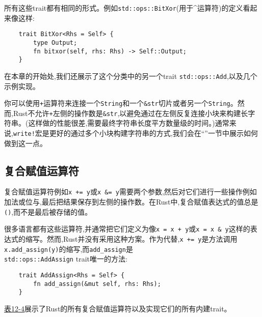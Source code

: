 所有这些trait都有相同的形式。例如\texttt{std::ops::BitXor}(用于\^{}运算符)的定义看起来像这样:
\begin{verbatim}
    trait BitXor<Rhs = Self> {
        type Output;
        fn bitxor(self, rhs: Rhs) -> Self::Output;
    }
\end{verbatim}

在本章的开始处,我们还展示了这个分类中的另一个trait \texttt{std::ops::Add},以及几个示例实现。

你可以使用\texttt{+}运算符来连接一个\texttt{String}和一个\texttt{\&str}切片或者另一个\texttt{String}。然而,Rust不允许\texttt{+}左侧的操作数是\texttt{\&str},以避免通过在左侧反复连接小块来构建长字符串。(这样做的性能很差,需要最终字符串长度平方数量级的时间。)通常来说,\texttt{write!}宏是更好的通过多个小块构建字符串的方式,我们会在“”一节中展示如何做到这一点。

\subsection{复合赋值运算符}\label{assign}
复合赋值运算符例如\texttt{x += y}或\texttt{x \&= y}需要两个参数,然后对它们进行一些操作例如加法或位与,最后把结果保存到左侧的操作数。在Rust中,复合赋值表达式的值总是\texttt{()},而不是最后被存储的值。

很多语言都有这些运算符,并通常把它们定义为像\texttt{x = x + y}或\texttt{x = x \& y}这样的表达式的缩写。然而,Rust并没有采用这种方案。作为代替,\texttt{x += y}是方法调用\texttt{x.add\_assign(y)}的缩写,而\texttt{add\_assign}是\\
\texttt{std::ops::AddAssign} trait唯一的方法:
\begin{verbatim}
    trait AddAssign<Rhs = Self> {
        fn add_assign(&mut self, rhs: Rhs);
    }
\end{verbatim}

\hyperref[t12-4]{表12-4}展示了Rust的所有复合赋值运算符以及实现它们的所有内建trait。

